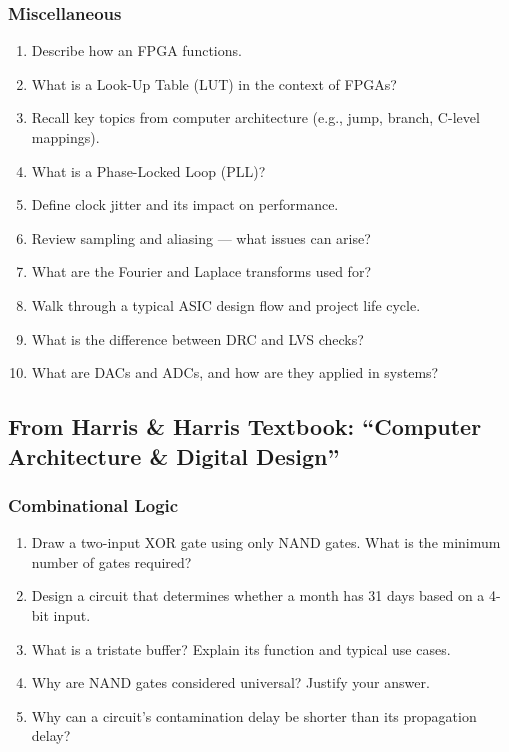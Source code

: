 \subsubsection*{Miscellaneous}
\begin{enumerate}
    \item Describe how an FPGA functions.
    \item What is a Look-Up Table (LUT) in the context of FPGAs?
    \item Recall key topics from computer architecture (e.g., jump, branch, C-level mappings).
    \item What is a Phase-Locked Loop (PLL)?
    \item Define clock jitter and its impact on performance.
    \item Review sampling and aliasing — what issues can arise?
    \item What are the Fourier and Laplace transforms used for?
    \item Walk through a typical ASIC design flow and project life cycle.
    \item What is the difference between DRC and LVS checks?
    \item What are DACs and ADCs, and how are they applied in systems?
\end{enumerate}


\subsection*{From Harris \& Harris Textbook: ``Computer Architecture \& Digital Design''}

\subsubsection*{Combinational Logic}
\begin{enumerate}
    \item Draw a two-input XOR gate using only NAND gates. What is the minimum number of gates required?
    \item Design a circuit that determines whether a month has 31 days based on a 4-bit input.
    \item What is a tristate buffer? Explain its function and typical use cases.
    \item Why are NAND gates considered universal? Justify your answer.
    \item Why can a circuit's contamination delay be shorter than its propagation delay?
\end{enumerate}

